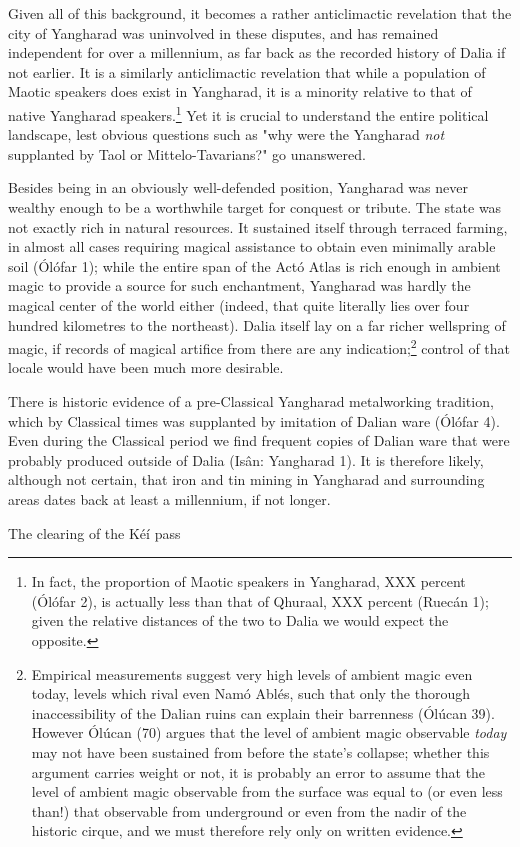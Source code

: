 \documentclass{article}
\begin{document}
{Given all of this background, it becomes a rather anticlimactic revelation that the city of Yangharad was uninvolved in these disputes, and has remained
independent for over a millennium, as far back as the recorded history of Dalia if not earlier. It is a similarly anticlimactic revelation that while a population of Maotic speakers does exist in Yangharad, it is a minority relative to that of native Yangharad speakers.\footnote{In fact, the proportion of Maotic speakers in Yangharad, XXX percent (Ólófar 2), is actually less than that of Qhuraal, XXX percent (Ruecán 1); given the relative distances of the two to Dalia we would expect the opposite.} Yet it is crucial to understand the entire political landscape, lest obvious questions such as "why were the Yangharad \emph{not} supplanted by Taol or Mittelo-Tavarians?" go unanswered.


Besides being in an obviously well-defended position, Yangharad was never
wealthy enough to be a worthwhile target for conquest or tribute. The state was not exactly rich in natural resources. It sustained itself through terraced farming, in almost all cases requiring magical assistance to obtain even minimally arable soil (Ólófar 1); while the entire span of the Actó Atlas is rich enough in ambient magic to provide a source for such enchantment, Yangharad was hardly the magical center of the world either (indeed, that quite literally lies over four hundred kilometres to the northeast). Dalia itself lay on a far richer wellspring of magic, if records of magical artifice from there are any indication;\footnote{Empirical measurements suggest very high levels of ambient magic even today, levels which rival even Namó Ablés, such that only the thorough inaccessibility of the Dalian ruins can explain their barrenness (Ólúcan 39). However Ólúcan (70) argues that the level of ambient magic observable \emph{today} may not have been sustained from before the state's collapse; whether this argument carries weight or not, it is probably an error to assume that the level of ambient magic observable from the surface was equal to (or even less than!) that observable from underground or even from the nadir of the historic cirque, and we must therefore rely only on written evidence.} control of that locale would have been much more desirable.

There is historic evidence of a pre-Classical Yangharad metalworking tradition, which by Classical times was supplanted by imitation of Dalian ware (Ólófar 4). Even during the Classical period we find frequent copies of Dalian ware that were probably produced outside of Dalia (Isân: Yangharad 1). It is therefore likely, although not certain, that iron and tin mining in Yangharad and surrounding areas dates back at least a millennium, if not longer.

The clearing of the Kéí pass

}
\end{document}
